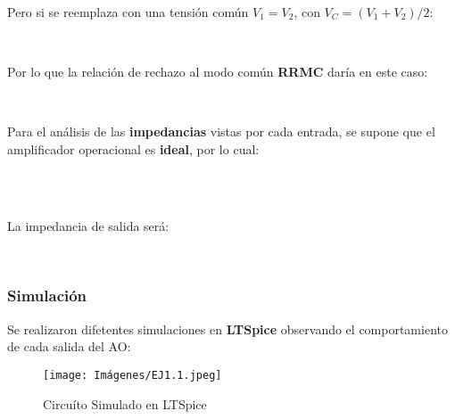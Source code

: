         \begin{center}
            \\
        \end{center}
        
        Pero si se reemplaza con una tensión común $V_1 = V_2$, con $V_C = (V_1 + V_2)/2$:\\
        
        \begin{center}
            \\  
        \end{center}

        Por lo que la relación de rechazo al modo común \textbf{RRMC} daría en este caso:\\
        
        \begin{center}
            \\
        \end{center}

        Para el análisis de las \textbf{impedancias} vistas por cada entrada, se supone que el amplificador operacional es \textbf{ideal}, por lo cual:\\

        \begin{center}
            \\
            \\
        \end{center}

        La impedancia de salida será:\\

        \begin{center}
            \\
        \end{center}
        
        \subsubsection{Simulación}
        Se realizaron difetentes simulaciones en \textbf{LTSpice} observando el comportamiento de cada salida del AO:\\

        \begin{figure}[ht]
        	\centering
        	\texttt{[image: Imágenes/EJ1.1.jpeg]}
        	\caption{Circuíto Simulado en LTSpice}
        \end{figure}
    
